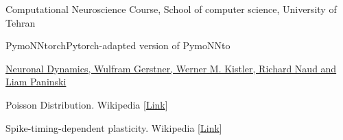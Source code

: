\begin{thebibliography}{1}
        \begin{latin}
            Computational Neuroscience Course, School of computer science, University of Tehran
        \end{latin}
        \begin{latin}
            PymoNNtorchPytorch-adapted version of PymoNNto
        \end{latin}
        \begin{latin}
            \href{https://neuronaldynamics.epfl.ch/online/Ch12.S3.html}{Neuronal Dynamics, Wulfram Gerstner, Werner M. Kistler, Richard Naud and Liam Paninski
            }
        \end{latin}
        \begin{latin}
            Poisson Distribution. Wikipedia
            [\href{https://en.wikipedia.org/wiki/Poisson_distribution}{Link}]
        \end{latin}
        \begin{latin}
            Spike-timing-dependent plasticity. Wikipedia
            [\href{https://en.wikipedia.org/wiki/Spike-timing-dependent_plasticity}{Link}]
        \end{latin}
    \end{thebibliography}